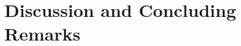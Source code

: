 \documentclass[b5paper,11 pt]{report}
\begin{document}
	

	



\chapter{Discussion and Concluding Remarks} 	%
	\label{chapterComparisonAndResults}

	

	



\end{document}
